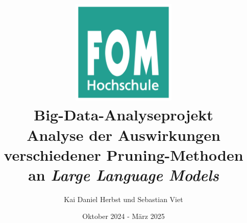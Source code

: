 \documentclass[12pt]{article}
\title{
    \includegraphics[width=5cm]{images/logo.png}
    \\
    \vspace{1cm}
    \textbf{Big-Data-Analyseprojekt}\\ \bigskip \large Analyse der Auswirkungen
    verschiedener Pruning-Methoden an \emph{Large Language Models}
}
\author{Kai Daniel Herbst und Sebastian Viet}
\date{Oktober 2024 - März 2025}
\begin{document}
\begin{sloppypar}
	\maketitle
	\thispagestyle{empty}

	\newpage
	\setcounter{page}{1}

	\renewcommand{\contentsname}{Inhaltsverzeichnis}
	\tableofcontents

	\newpage
	\setcounter{page}{1}

	
	
	
	
	

\end{sloppypar}
\end{document}
